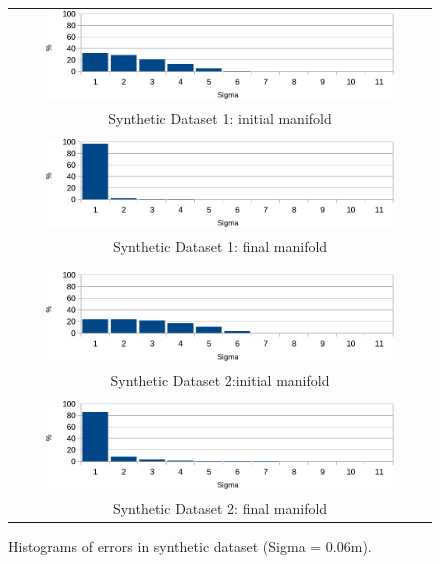 \begin{figure}[t]
\setlength{\tabcolsep}{1px}
\centering
\begin{tabular}{c}
\includegraphics[width=0.85\textwidth]{./img/synth1InitHist}\\
Synthetic Dataset 1: initial manifold\\
 \\
\includegraphics[width=0.85\textwidth]{./img/synth1ResHist}\\
Synthetic Dataset 1: final manifold\\
 \\
 \\
\includegraphics[width=0.85\textwidth]{./img/synth2InitHist}\\
Synthetic Dataset 2:initial manifold\\
 \\
\includegraphics[width=0.85\textwidth]{./img/synth2ResHist}\\
Synthetic Dataset 2: final manifold\\
\end{tabular}
\caption{Histograms of errors in synthetic dataset (Sigma = 0.06m).}
\label{fig:simulatedhist}
\end{figure}


